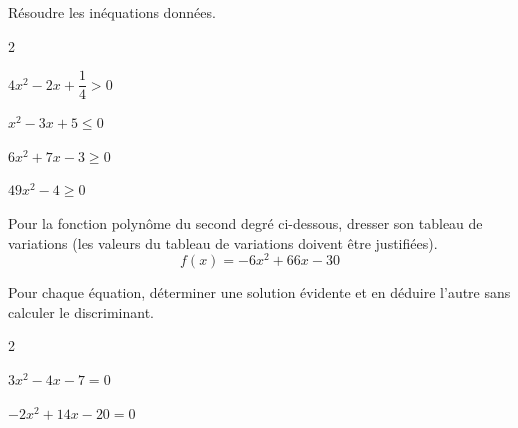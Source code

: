 \documentclass[12pt,a4paper]{article}  %
\begin{document}
\vspace{-0.3cm}

Résoudre les inéquations données.
\begin{multicols}{2}
\begin{enumMet}
    \item $4 x^{2}-2 x+\dfrac{1}{4}>0$
    \item {} $x^{2}-3 x+5 \leqslant 0$
    \item $6 x^{2}+7 x-3 \geqslant 0$
    \item $49 x^{2}-4 \geqslant 0$
\end{enumMet}
\end{multicols}

\vspace{-0.3cm}
Pour la fonction polynôme du second degré ci-dessous, dresser son tableau de variations (les valeurs du tableau de variations doivent être justifiées).
$$f(x)=-6x^2+66x-30$$

\vspace{-0.3cm}

Pour chaque équation, déterminer une solution évidente et en déduire l'autre sans calculer le discriminant.
\begin{multicols}{2}
\begin{enumMet}
    \item $3x^2-4x-7=0$
    \item $-2x^2+14x-20=0$
\end{enumMet}
\end{multicols}

\newpage




\end{document}

